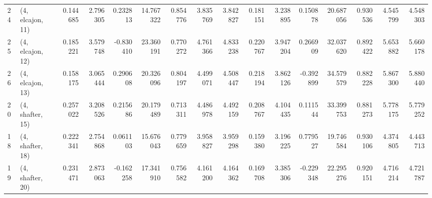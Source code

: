 \begin{tabular}{llrrrrrrrrrrrrrr}
24 &  (4, elcajon, 11) &   0.144685 &  2.796305 &  0.232813 &  14.767322 &  0.854776 &   3.835769 &  3.842827 &  0.181151 &   3.238895 &  0.150878 &   20.687056 &  0.930536 &   4.545799 &   4.548303 \\
25 &  (4, elcajon, 12) &   0.185221 &  3.579748 & -0.830410 &  23.360191 &  0.770272 &   4.761366 &  4.833238 &  0.220767 &   3.947204 &  0.266909 &   32.037620 &  0.892422 &   5.653882 &   5.660178 \\
26 &  (4, elcajon, 13) &   0.158175 &  3.065444 &  0.290608 &  20.326096 &  0.804197 &   4.499071 &  4.508447 &  0.218194 &   3.862126 & -0.392899 &   34.579579 &  0.882228 &   5.867300 &   5.880440 \\
20 &  (4, shafter, 15) &   0.257022 &  3.208526 &  0.215686 &  20.179489 &  0.713311 &   4.486978 &  4.492159 &  0.208767 &   4.104435 &  0.111544 &   33.399753 &  0.881273 &   5.778175 &   5.779252 \\
18 &  (4, shafter, 18) &   0.222341 &  2.754868 &  0.061103 &  15.676043 &  0.779659 &   3.958827 &  3.959298 &  0.159380 &   3.196225 &  0.779527 &   19.746584 &  0.930106 &   4.374805 &   4.443713 \\
19 &  (4, shafter, 20) &   0.231471 &  2.873063 & -0.162258 &  17.341910 &  0.756582 &   4.161200 &  4.164362 &  0.169708 &   3.385306 & -0.229348 &   22.295276 &  0.920151 &   4.716214 &   4.721787 \\
\bottomrule
\end{tabular}

